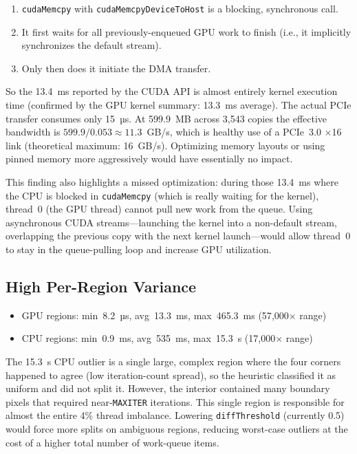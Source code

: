 \documentclass[
	english,
	letterpaper, oneside
]{article}
\begin{document}
\begin{enumerate}
    \item \texttt{cudaMemcpy} with \texttt{cudaMemcpyDeviceToHost} is a
    blocking, synchronous call.
    \item It first waits for all previously-enqueued GPU work to finish
    (i.e., it implicitly synchronizes the default stream).
    \item Only then does it initiate the DMA transfer.
\end{enumerate}

So the 13.4~ms reported by the CUDA API is almost entirely
kernel execution time (confirmed by the GPU kernel summary:
13.3~ms average). The actual PCIe transfer consumes only 15~µs. At
599.9~MB across 3{,}543 copies the effective bandwidth is
$599.9 / 0.053 \approx 11.3$~GB/s, which is healthy use of a PCIe~3.0
$\times$16 link (theoretical maximum: 16~GB/s). Optimizing memory layouts
or using pinned memory more aggressively would have essentially no impact.

This finding also highlights a missed optimization: during those
13.4~ms where the CPU is blocked in \texttt{cudaMemcpy} (which is really
waiting for the kernel), thread~0 (the GPU thread) cannot pull new work
from the queue. Using asynchronous CUDA streams—launching the kernel into
a non-default stream, overlapping the previous copy with the next kernel
launch—would allow thread~0 to stay in the queue-pulling loop and increase
GPU utilization.

\subsection{High Per-Region Variance}

\begin{itemize}
    \item GPU regions: min~8.2~µs, avg~13.3~ms, max~465.3~ms
    (57{,}000$\times$ range)
    \item CPU regions: min~0.9~ms, avg~535~ms, max~15.3~s
    (17{,}000$\times$ range)
\end{itemize}

The 15.3~s CPU outlier is a single large, complex region where the four
corners happened to agree (low iteration-count spread), so the heuristic
classified it as uniform and did not split it. However, the interior
contained many boundary pixels that required near-\texttt{MAXITER}
iterations. This single region is responsible for almost the entire 4\%
thread imbalance. Lowering \texttt{diffThreshold} (currently 0.5) would
force more splits on ambiguous regions, reducing worst-case outliers at the
cost of a higher total number of work-queue items.
\end{document}

